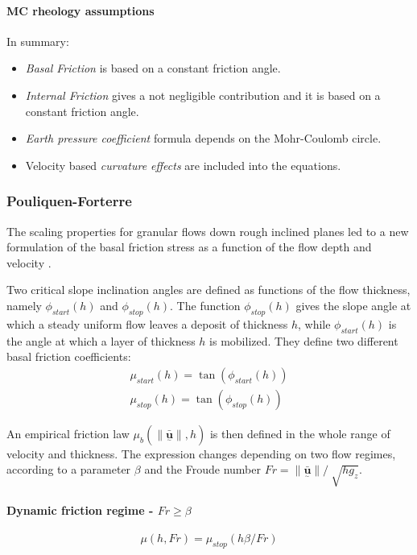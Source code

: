 \documentclass{article}
\begin{document}
\paragraph{MC rheology assumptions} In summary:
\begin{itemize}
\item \textit{Basal Friction} is based on a constant friction angle.

\item \textit{Internal Friction} gives a not negligible contribution and it is based on a constant friction angle.

\item \textit{Earth pressure coefficient} formula depends on the Mohr-Coulomb circle.

\item Velocity based \textit{curvature effects} are included into the equations.
\end{itemize}

\subsubsection{Pouliquen-Forterre}\label{PFM}
The scaling properties for granular flows down rough inclined planes led to a new formulation of the basal friction stress as a function of the flow depth and velocity \citep{Pouliquen1999}.

Two critical slope inclination angles are defined as functions of the flow thickness, namely $\phi_{start}(h)$ and $\phi_{stop}(h)$. The function $\phi_{stop}(h)$ gives the slope angle at which a steady uniform flow leaves a deposit of thickness $h$, while $\phi_{start}(h)$ is the angle at which a layer of thickness $h$ is mobilized. They define two different basal friction coefficients:
\begin{eqnarray}
\mu_{start}(h)=\tan(\phi_{start}(h))\\
\mu_{stop}(h)=\tan(\phi_{stop}(h))
\end{eqnarray}

An empirical friction law $\mu_{b}(\|\underset{^\sim}{\bar{\textbf{u}}} \| , h)$ is then defined in the whole range of velocity and thickness. The expression changes depending on two flow regimes, according to a parameter $\beta$ and the Froude number $Fr=\| \underset{^\sim}{\bar{\textbf{u}}} \| / \ \sqrt{h g_{z}}$.

\paragraph{Dynamic friction regime - $Fr \ge \beta$}
\begin{equation}\label{mu_beta1}
\mu(h, Fr)=\mu_{stop}(h \beta / Fr)
\end{equation}
\end{document}
